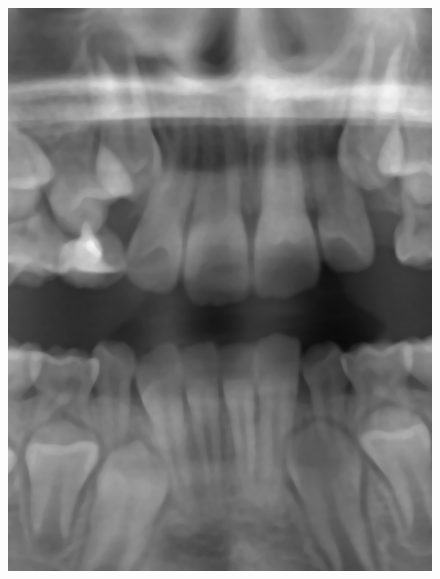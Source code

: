 \documentclass[a4paper,titlepage,12pt]{article}
\begin{document}
\begin{figure}
\begin{minipage}[b]{0.32\linewidth}
		\includegraphics[width=\linewidth]{preprocess/median.png}
	\end{minipage}
	\begin{minipage}[b]{0.32\linewidth}

\end{minipage}
\end{figure}
\end{document}
